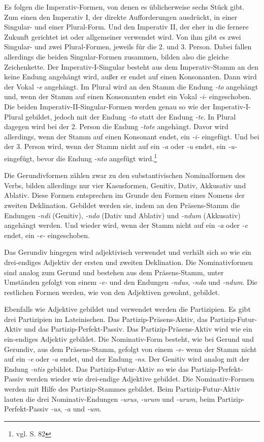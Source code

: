 \documentclass[fontsize=12pt,abstract=on,titlepage,bibliography=totoc,ngerman,listof=totoc]{scrreprt}
\begin{document}
Es folgen die Imperativ-Formen, von denen es üblicherweise sechs Stück gibt. Zum einen den Imperativ I, der direkte Aufforderungen ausdrückt, in einer Singular- und einer Plural-Form. Und den Imperativ II, der eher in die fernere Zukunft gerichtet ist oder allgemeiner verwendet wird. Von ihm gibt es zwei Singular- und zwei Plural-Formen, jeweils für die 2. und 3. Person. Dabei fallen allerdings die beiden Singular-Formen zusammen, bilden also die gleiche Zeichenkette. Der Imperativ-I-Singular besteht aus dem Imperativ-Stamm an den keine Endung angehängt wird, außer er endet auf einen Konsonanten. Dann wird der Vokal \textit{-e} angehängt. Im Plural wird an den Stamm die Endung \textit{-to} angehängt und, wenn der Stamm auf einen Konsonanten endet ein Vokal \textit{-i-} eingeschoben. Die beiden Imperativ-II-Singular-Formen werden genau so wie der Imperativ-I-Plural gebildet, jedoch mit der Endung \textit{-to} statt der Endung \textit{-te}. In Plural dagegen wird bei der 2. Person die Endung \textit{-tote} angehängt. Davor wird allerdings, wenn der Stamm auf einen Konsonant endet, ein \textit{-i-} eingefügt. Und bei der 3. Person wird, wenn der Stamm nicht auf ein \textit{-a} oder \textit{-u} endet, ein \textit{-u-} eingefügt, bevor die Endung \textit{-nto} angefügt wird.\footnote{vgl. \cite{BAYER-LINDAUER1994} S. 82} \par
Die Gerundivformen zählen zwar zu den substantivischen Nominalformen des Verbs, bilden allerdings nur vier Kasusformen, Genitiv, Dativ, Akkusativ und Ablativ. Diese Formen entsprechen im Grunde den Formen eines Nomens der zweiten Deklination. Gebildet werden sie, indem an den Präsens-Stamm die Endungen \textit{-ndi} (Genitiv), \textit{-ndo} (Dativ und Ablativ) und \textit{-ndum} (Akkusativ) angehängt werden. Und wieder wird, wenn der Stamm nicht auf ein \textit{-a} oder \textit{-e} endet, ein \textit{-e-} eingeschoben.\par
Das Gerundiv hingegen wird adjektivisch verwendet und verhält sich so wie ein drei-endiges Adjektiv der ersten und zweiten Deklination. Die Nominativformen sind analog zum Gerund und bestehen aus dem Präsens-Stamm, unter Umständen gefolgt von einem \textit{-e-} und den Endungen \textit{-ndus}, \textit{-nda} und \textit{-ndum}. Die restlichen Formen werden, wie von den Adjektiven gewohnt, gebildet.\par
Ebenfalls wie Adjektive gebildet und verwendet werden die Partizipien. Es gibt drei Partizipien im Lateinischen. Das Partizip-Präsens-Aktiv, das Partizip-Futur-Aktiv und das Partizip-Perfekt-Passiv. Das Partizip-Präsens-Aktiv wird wie ein ein-endiges Adjektiv gebildet. Die Nominativ-Form besteht, wie bei Gerund und Gerundiv, aus dem Präsens-Stamm, gefolgt von einem \textit{-e-} wenn der Stamm nicht auf ein \textit{-e} oder \textit{-a} endet, und der Endung \textit{-ns}. Der Genitiv wird analog mit der Endung \textit{-ntis} gebildet. Das Partizip-Futur-Aktiv so wie das Partizip-Perfekt-Passiv werden wieder wie drei-endige Adjektive gebildet. Die Nominativ-Formen werden mit Hilfe des Partizip-Stammes gebildet. Beim Partizip-Futur-Aktiv lauten die drei Nominativ-Endungen \textit{-urus}, \textit{-urum} und \textit{-urum}, beim Partizip-Perfekt-Passiv \textit{-us}, \textit{-a} und \textit{-um}.
\end{document}
